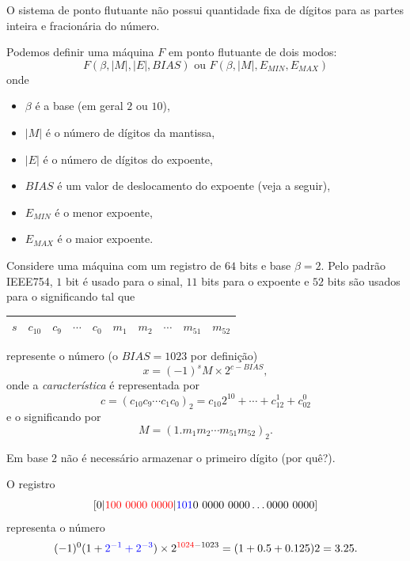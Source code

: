 O sistema de ponto flutuante não possui quantidade fixa de dígitos para as partes inteira e fracionária do número.

Podemos definir uma máquina $F$ em ponto flutuante de dois modos:
$$ F(\beta,|M|,|E|,BIAS) \text{ ou } F(\beta,|M|,E_{MIN},E_{MAX})$$
onde
\begin{itemize}
 \item $\beta$ é a base (em geral $2$ ou $10$),
 \item $|M|$ é o número de dígitos da mantissa,
 \item $|E|$ é o número de dígitos do expoente,
 \item $BIAS$ é um valor de deslocamento do expoente (veja a seguir),
 \item $E_{MIN}$ é o menor expoente,
 \item $E_{MAX}$ é o maior expoente.
\end{itemize}


Considere uma máquina com um registro de $64$ bits e base $\beta=2$. Pelo padrão IEEE754, $1$ bit é usado para o sinal, $11$ bits para o expoente e $52$ bits são usados para o significando tal que
\begin{center}
  \begin{tabular}{|c|c|c|c|c|c|c|c|c|c|}\hline
    $s$ & $c_{10}$ & $c_{9}$ & $\cdots$ & $c_{0}$ & $m_1$ & $m_2$ & $\cdots$ & $m_{51}$ & $m_{52}$\\\hline
  \end{tabular}
\end{center}
represente o número (o $BIAS=1023$ por definição)
$$ x=(-1)^{s}M \times 2^{c-BIAS},$$
onde a \emph{característica} é representada por
$$c=(c_{10}c_9\cdots c_1c_0)_2=c_{10}2^{10}+\cdots+c_12^1+c_02^0 $$
e o significando por
$$M=(1.m_1m_2\cdots m_{51}m_{52})_2.$$

\begin{obs}
  Em base $2$ não é necessário armazenar o primeiro dígito (por quê?).
\end{obs}

\begin{ex}
O registro
$$
[0|{\color{red}{100~0000~0000}} |{\color{blue}{101}}0~0000~0000\ldots 0000~0000]
$$
representa o número
$$
(-1)^0(1+{\color{blue}{2^{-1}+2^{-3}}})\times  2^{{\color{red}{1024}}-1023}=(1+0.5+0.125)2=3.25.
$$
\end{ex}


